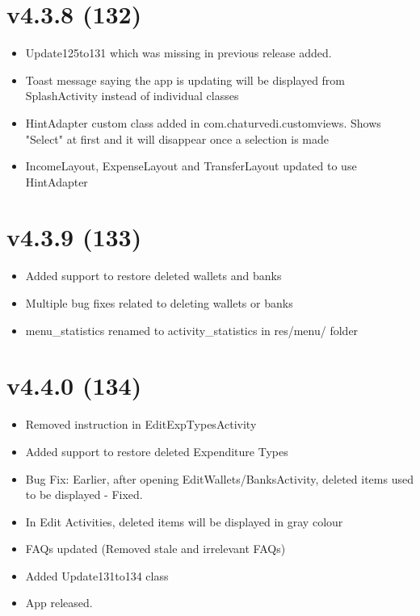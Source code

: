 \documentclass{article}
\begin{document}
    \section{v4.3.8 (132)}\label{sec:132}
    \begin{itemize}
        \item Update125to131 which was missing in previous release added.
        \item Toast message saying the app is updating will be displayed from SplashActivity instead of individual classes
        \item HintAdapter custom class added in com.chaturvedi.customviews.
        Shows "Select" at first and it will disappear once a selection is made
        \item IncomeLayout, ExpenseLayout and TransferLayout updated to use HintAdapter
    \end{itemize}

    \section{v4.3.9 (133)}\label{sec:133}
    \begin{itemize}
        \item Added support to restore deleted wallets and banks
        \item Multiple bug fixes related to deleting wallets or banks
        \item menu\_statistics renamed to activity\_statistics in res/menu/ folder
    \end{itemize}

    \section{v4.4.0 (134)}\label{sec:134}
    \begin{itemize}
        \item Removed instruction in EditExpTypesActivity
        \item Added support to restore deleted Expenditure Types
        \item Bug Fix: Earlier, after opening EditWallets/BanksActivity, deleted items used to be displayed - Fixed.
        \item In Edit Activities, deleted items will be displayed in gray colour
        \item FAQs updated (Removed stale and irrelevant FAQs)
        \item Added Update131to134 class
        \item App released.
    \end{itemize}
\end{document}
